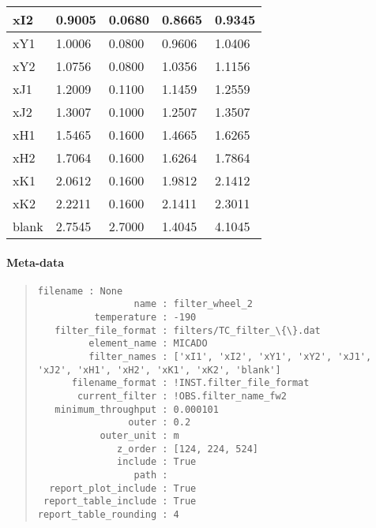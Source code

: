 \begin{longtable*}[c]{|p{0.075\DUtablewidth}|p{0.086\DUtablewidth}|p{0.086\DUtablewidth}|p{0.145\DUtablewidth}|p{0.133\DUtablewidth}|}
xI2
 & 
0.9005
 & 
0.0680
 & 
0.8665
 & 
0.9345
 \\
\hline

xY1
 & 
1.0006
 & 
0.0800
 & 
0.9606
 & 
1.0406
 \\
\hline

xY2
 & 
1.0756
 & 
0.0800
 & 
1.0356
 & 
1.1156
 \\
\hline

xJ1
 & 
1.2009
 & 
0.1100
 & 
1.1459
 & 
1.2559
 \\
\hline

xJ2
 & 
1.3007
 & 
0.1000
 & 
1.2507
 & 
1.3507
 \\
\hline

xH1
 & 
1.5465
 & 
0.1600
 & 
1.4665
 & 
1.6265
 \\
\hline

xH2
 & 
1.7064
 & 
0.1600
 & 
1.6264
 & 
1.7864
 \\
\hline

xK1
 & 
2.0612
 & 
0.1600
 & 
1.9812
 & 
2.1412
 \\
\hline

xK2
 & 
2.2211
 & 
0.1600
 & 
2.1411
 & 
2.3011
 \\
\hline

blank
 & 
2.7545
 & 
2.7000
 & 
1.4045
 & 
4.1045
 \\
\hline
\end{longtable*}
\label{tbl-filter-wheel-2}


\paragraph{Meta-data%
  \label{id6}%
}

\begin{quote}
\begin{alltt}
\begin{lstlisting}[frame=single]
             filename : None
                 name : filter_wheel_2
          temperature : -190
   filter_file_format : filters/TC_filter_\{\}.dat
         element_name : MICADO
         filter_names : ['xI1', 'xI2', 'xY1', 'xY2', 'xJ1', 'xJ2', 'xH1', 'xH2', 'xK1', 'xK2', 'blank']
      filename_format : !INST.filter_file_format
       current_filter : !OBS.filter_name_fw2
   minimum_throughput : 0.000101
                outer : 0.2
           outer_unit : m
              z_order : [124, 224, 524]
              include : True
                 path :
  report_plot_include : True
 report_table_include : True
report_table_rounding : 4
\end{lstlisting}
\end{alltt}
\end{quote}


